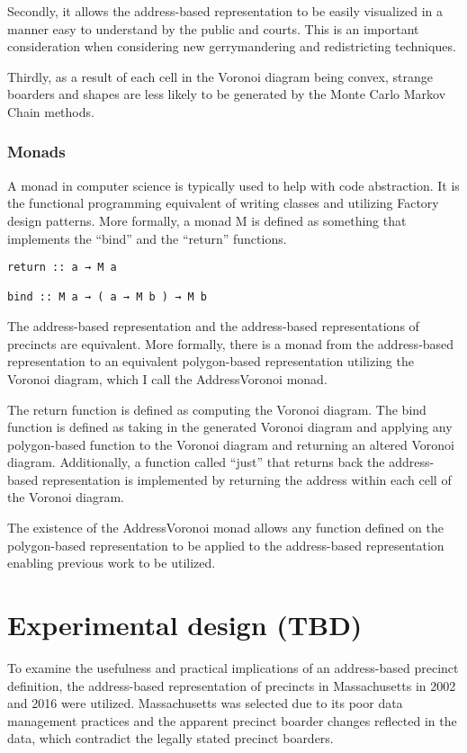 \documentclass[11pt]{article}
\begin{document}
Secondly, it allows the address-based representation to be easily visualized in a manner easy to understand by the public and courts. This is an important consideration when considering new gerrymandering and redistricting techniques. 

Thirdly, as a result of each cell in the Voronoi diagram being convex, strange boarders and shapes are less likely to be generated by the Monte Carlo Markov Chain methods.

\subsubsection{Monads}
\label{sec:orgac8d56d}
A monad in computer science is typically used to help with code abstraction. It is the functional programming equivalent of writing classes and utilizing Factory design patterns. More formally, a monad M is defined as something that implements the “bind” and the “return” functions. 

\begin{verbatim}
return :: a → M a

bind :: M a → ( a → M b ) → M b

\end{verbatim}

The address-based representation and the address-based representations of precincts are equivalent. More formally, there is a monad from the address-based representation to an equivalent polygon-based representation utilizing the Voronoi diagram, which I call the AddressVoronoi monad.

The return function is defined as computing the Voronoi diagram. The bind function is defined as taking in the generated Voronoi diagram and applying any polygon-based function to the Voronoi diagram and returning an altered Voronoi diagram. Additionally, a function called “just” that returns back the address-based representation is implemented by returning the address within each cell of the Voronoi diagram.

The existence of the AddressVoronoi monad allows any function defined on the polygon-based representation to be applied to the address-based representation enabling previous work to be utilized.

\section{Experimental design (TBD)}
\label{sec:org9359195}

To examine the usefulness and practical implications of an address-based precinct definition, the address-based representation of precincts in Massachusetts in 2002 and 2016 were utilized. Massachusetts was selected due to its poor data management practices and the apparent precinct boarder changes reflected in the data, which contradict the legally stated precinct boarders.
\end{document}

